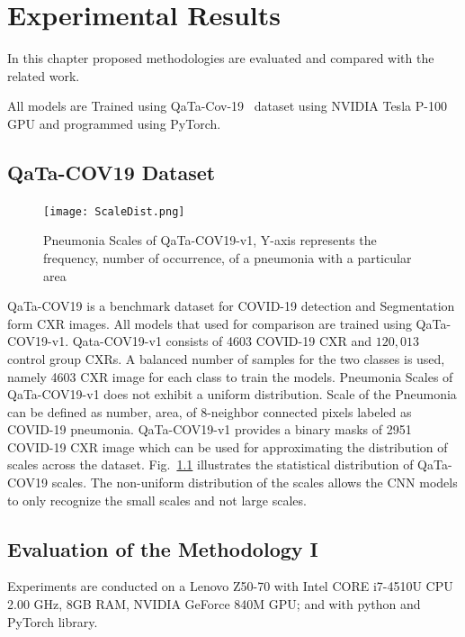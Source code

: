 
\chapter{Experimental Results} %

\label{chp:results} %
In this chapter proposed methodologies are evaluated and compared with the related work.

All models are Trained using QaTa-Cov-19~\cite{ahishali2021advance} dataset using NVIDIA Tesla P-100 GPU and programmed using PyTorch.
\section{QaTa-COV19 Dataset}
\begin{center}
\begin{figure}[htbp]
\centerline{\texttt{[image: ScaleDist.png]}}
\caption{Pneumonia Scales of QaTa-COV19-v1, Y-axis represents the frequency, number of occurrence, of a pneumonia with a particular area}
\label{pdist}
\end{figure}
\end{center}
QaTa-COV19 is a benchmark dataset for COVID-19 detection and Segmentation form CXR images. All models that used for comparison are trained using QaTa-COV19-v1. Qata-COV19-v1 consists of 4603 COVID-19 CXR and $120,013$ control group CXRs. A balanced number of samples for the two classes is used, namely 4603 CXR image for each class to train the models. Pneumonia Scales of QaTa-COV19-v1 does not exhibit a uniform distribution. Scale of the Pneumonia can be defined as number, area, of 8-neighbor connected pixels labeled as COVID-19 pneumonia. QaTa-COV19-v1 provides a binary masks of 2951 COVID-19 CXR image which can be used for approximating the distribution of scales across the dataset. Fig.~\ref{pdist} illustrates the statistical distribution of QaTa-COV19 scales. The non-uniform distribution of the scales allows the CNN models to only recognize the small scales and not large scales.

\section{Evaluation of the Methodology I}

Experiments are conducted on a Lenovo Z50-70 with Intel CORE i7-4510U CPU 2.00 GHz, 8GB RAM, NVIDIA GeForce 840M GPU; and with python and PyTorch library.

